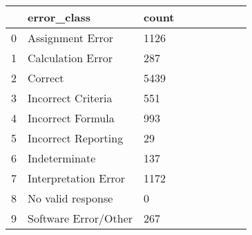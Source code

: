 \begin{tabular}{|l|l|l|l|l|l|l|l|l|}
\toprule
 & error\_class & count \\
\midrule
0 & Assignment Error & 1126 \\
1 & Calculation Error & 287 \\
2 & Correct & 5439 \\
3 & Incorrect Criteria & 551 \\
4 & Incorrect Formula & 993 \\
5 & Incorrect Reporting & 29 \\
6 & Indeterminate & 137 \\
7 & Interpretation Error & 1172 \\
8 & No valid response & 0 \\
9 & Software Error/Other & 267 \\
\bottomrule
\end{tabular}

